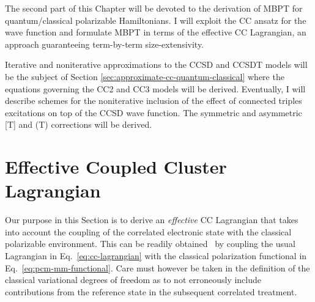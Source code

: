 The second part of this Chapter will be devoted to the derivation of
\acrshort{MBPT} for quantum/classical polarizable Hamiltonians.
I will exploit the \acrshort{CC} ansatz for the wave function and formulate
\acrshort{MBPT} in terms of the effective \acrshort{CC} Lagrangian, an approach
guaranteeing term-by-term size-extensivity.

Iterative and noniterative approximations to the \acrshort{CCSD} and \acrshort{CCSDT} models will
be the subject of Section \ref{sec:approximate-cc-quantum-classical} where the equations
governing the \acrshort{CC2} and \acrshort{CC3} models will be derived.
Eventually, I will describe schemes for the noniterative inclusion of
the effect of connected triples excitations on top of
the \acrshort{CCSD} wave function. The symmetric and asymmetric [T] and (T)
corrections will be derived.

\section{Effective Coupled Cluster Lagrangian}
\label{sec:effective-cc-lagrangian}

Our purpose in this Section is to derive an \emph{effective} \acrshort{CC}
Lagrangian that takes into account the coupling of the correlated
electronic state with the classical polarizable
environment.
This can be readily obtained~\autocite{Lipparini2016-mo} by coupling the
usual Lagrangian in Eq.~\eqref{eq:cc-lagrangian} with the classical
polarization functional in Eq.~\eqref{eq:pcm-mm-functional}.
Care must however be taken in the definition of the classical
variational degrees of freedom as to not erroneously include
contributions from the reference state in the subsequent correlated
treatment.

